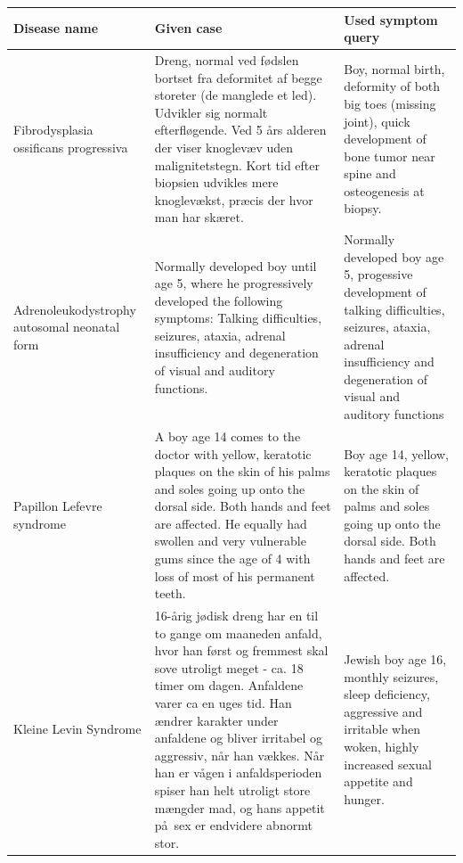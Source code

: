 \begin{table}[H]
  \begin{scriptsize}
    \begin{tabular}{| p{3cm} | p{4.5cm} | p{4.5cm} |}
      \hline
      Disease name & Given case & Used symptom query \\
      \hline
      Fibrodysplasia ossificans progressiva & Dreng, normal ved f\o dslen bortset fra deformitet af begge storeter (de manglede et led). Udvikler sig normalt efterfl\o gende. Ved 5 \aa rs alderen der viser knoglev\ae v uden malignitetstegn. Kort tid efter biopsien udvikles mere knoglev\ae kst, pr\ae cis der hvor man har sk\ae ret. & Boy, normal birth, deformity of both big toes (missing joint), quick development of bone tumor near spine and osteogenesis at biopsy.\\
      \hline
      Adrenoleukodystrophy autosomal neonatal form & Normally developed boy until age 5, where he progressively developed the following symptoms: Talking difficulties, seizures, ataxia, adrenal insufficiency and  degeneration of visual and auditory functions.& Normally developed boy age 5, progessive development of talking difficulties, seizures, ataxia, adrenal insufficiency and  degeneration of visual and auditory functions \\
      \hline
      Papillon Lefevre syndrome & A boy age 14 comes to the doctor with yellow, keratotic plaques on the skin of his palms and soles going up onto the dorsal side. Both hands and feet are affected. He equally had swollen and very vulnerable gums since the age of 4 with loss of most of his permanent teeth. & Boy age 14, yellow, keratotic plaques on the skin of palms and soles going up onto the dorsal side. Both hands and feet are affected.\\
      \hline
      Kleine Levin Syndrome & 16-\aa rig j\o disk dreng har en til to gange om maaneden anfald, hvor han f\o rst og fremmest skal sove utroligt meget - ca. 18 timer om dagen. Anfaldene varer ca en uges tid. Han \ae ndrer karakter under anfaldene og bliver irritabel og aggressiv, n\aa r han v\ae kkes. N\aa r han er v\aa gen i anfaldsperioden spiser han helt utroligt store m\ae ngder mad, og hans appetit p\aa\ sex er endvidere abnormt stor. & Jewish boy age 16, monthly seizures, sleep deficiency, aggressive and irritable when woken, highly increased sexual appetite and hunger.\\
      \hline

\end{tabular}
\end{scriptsize}
\end{table}

